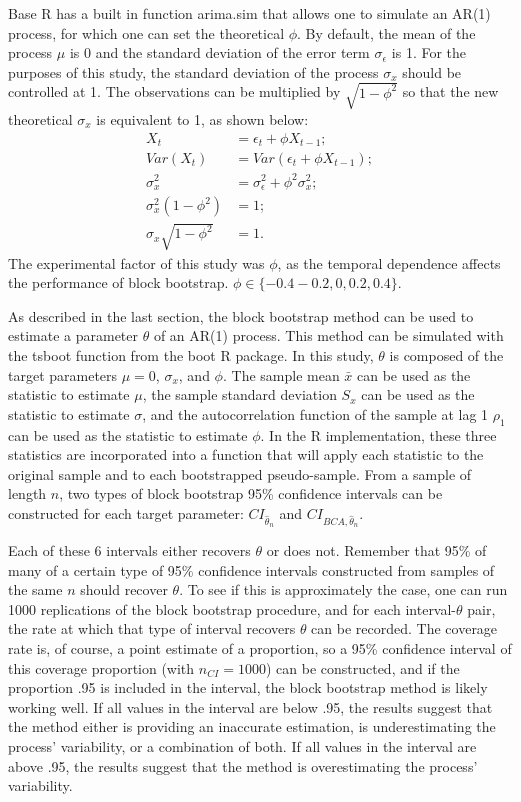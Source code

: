\documentclass[12pt, letterpaper, titlepage]{article}
\begin{document}
Base R has a built in function arima.sim that allows one to simulate an AR(1)
process, for which one can set the theoretical $\phi$. By default, the mean of
the process $\mu$ is 0 and the standard deviation of the error term
$\sigma_{\epsilon}$ is 1. For the purposes of this study, the standard
deviation of the process $\sigma_{x}$ should be controlled at 1. The
observations can be multiplied by $\sqrt{1 - \phi^2}$ so that the new
theoretical $\sigma_{x}$ is equivalent to 1, as shown below:
\begin{align}
X_{t} &= \epsilon_{t} + \phi X_{t-1};\\
Var(X_{t}) &= Var(\epsilon_{t} + \phi X_{t-1});\\
\sigma^2_{x} &= \sigma^2_{\epsilon} + \phi^2 \sigma^2_{x};\\
\sigma^2_{x}(1 - \phi^2) &= 1;\\
\sigma_{x}\sqrt{1 - \phi^2} &= 1.
\end{align}
The experimental factor of this study was $\phi$, as the temporal dependence
affects the performance of block bootstrap.
$\phi \in \{-0.4 -0.2, 0, 0.2, 0.4\}$.



As described in the last section, the block bootstrap method can be used to
estimate a parameter $\theta$ of an AR(1) process. This method can be
simulated with the tsboot function from the boot R package. In this study,
$\theta$ is composed of the target parameters $\mu = 0$, $\sigma_{x}$, and
$\phi$. The sample mean $\bar{x}$ can be used as the statistic to estimate
$\mu$, the sample standard deviation $S_x$ can be used as the statistic to
estimate $\sigma$, and the autocorrelation function of the sample at lag 1
$\rho_1$ can be used as the statistic to estimate $\phi$. In the R
implementation, these three statistics are incorporated into a function that
will apply each statistic to the original sample and to each bootstrapped
pseudo-sample. From a sample of length $n$, two types of block bootstrap 95\%
confidence intervals can be constructed for each target parameter:
$CI_{\hat{\theta}_{n}}$ and $CI_{BCA, \hat{\theta}_{n}}$.


Each of these 6 intervals either recovers $\theta$ or does not. Remember that
95\% of many of a certain type of 95\% confidence intervals constructed from
samples of the same $n$ should recover $\theta$. To see if this is
approximately the case, one can run 1000 replications of the block bootstrap
procedure, and for each interval-$\theta$ pair, the rate at which that type of
interval recovers $\theta$ can be recorded. The coverage rate is, of course, a
point estimate of a proportion, so a 95\% confidence interval of this coverage
proportion (with $n_{CI} = 1000$) can be constructed, and if the proportion
.95 is included in the interval, the block bootstrap method is likely working
well. If all values in the interval are below .95, the results suggest that the
method either is providing an inaccurate estimation, is underestimating the
process' variability, or a combination of both. If all values in the interval
are above .95, the results suggest that the method is overestimating the
process' variability.
\end{document}
